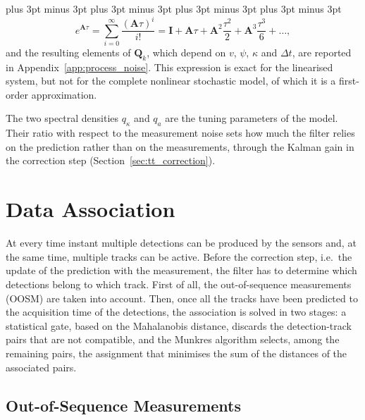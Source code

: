 \abovedisplayskip=16pt plus 3pt minus 3pt \belowdisplayskip=16pt plus 3pt minus 3pt
\abovedisplayshortskip=16pt plus 3pt minus 3pt \belowdisplayshortskip=16pt plus 3pt minus 3pt
\begin{equation}
    e^{\mathbf{A}\tau} = \sum_{i=0}^{\infty} \frac{(\mathbf{A}\tau)^i}{i!}
    = \mathbf{I} + \mathbf{A}\tau + \mathbf{A}^2\frac{\tau^2}{2} + \mathbf{A}^3\frac{\tau^3}{6}
    + \dots,
    \label{eq:tt_exp_series}
\end{equation}
and the resulting elements of $\mathbf{Q}_k$, which depend on $v$, $\psi$, $\kappa$ and
$\Delta t$, are reported in Appendix~\ref{app:process_noise}. This expression is exact for the
linearised system, but not for the complete nonlinear stochastic model, of which it is a
first-order approximation.

The two spectral densities $q_\kappa$ and $q_a$ are the tuning parameters of the model.
Their ratio with respect to the measurement noise sets how much the filter relies on the
prediction rather than on the measurements, through the Kalman gain in the correction step
(Section~\ref{sec:tt_correction}).

\section{Data Association}
\label{sec:tt_association}

At every time instant multiple detections can be produced by the sensors and, at the same
time, multiple tracks can be active. Before the correction step, i.e.\ the update of the prediction with the measurement, the
filter has to determine which detections belong to which track. First of all, the out-of-sequence measurements (OOSM) are taken into account. Then, once all the tracks have been
predicted to the acquisition time of the detections, the association is solved in two
stages: a statistical gate, based on the Mahalanobis distance, discards the
detection-track pairs that are not compatible, and the Munkres algorithm selects, among
the remaining pairs, the assignment that minimises the sum of
the distances of the associated pairs.

\subsection{Out-of-Sequence Measurements}
\label{subsec:tt_oosm}

